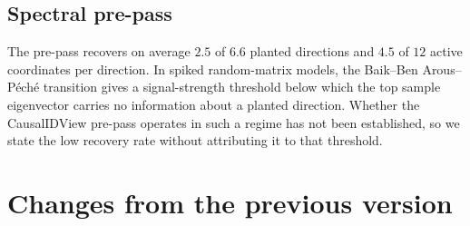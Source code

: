 \documentclass[11pt]{article}
\theoremstyle{definition}
\theoremstyle{remark}
\begin{document}
\subsection{Spectral pre-pass}
The pre-pass recovers on average $2.5$ of $6.6$ planted directions and $4.5$ of $12$ active
coordinates per direction. In spiked random-matrix models, the Baik--Ben Arous--P\'ech\'e transition
\cite{BBP2005} gives a signal-strength threshold below which the top sample eigenvector carries no
information about a planted direction. Whether the CausalIDView pre-pass operates in such a regime has
not been established, so we state the low recovery rate without attributing it to that threshold.

\section{Changes from the previous version}\label{app:changes}
\end{document}
